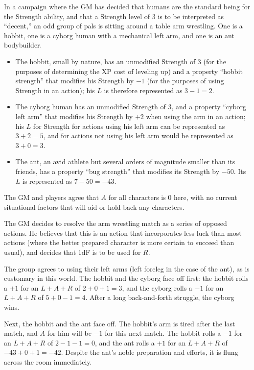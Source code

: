 \begin{example}
In a campaign where the GM has decided that humans are the standard being for the Strength ability,
and that a Strength level of 3 is to be interpreted as ``decent,'' an odd group of pals is sitting around a table arm wrestling.
One is a hobbit, one is a cyborg human with a mechanical left arm, and one is an ant bodybuilder.
\begin{itemize}
\item The hobbit, small by nature, has an unmodified Strength of $3$ (for the purposes of determining the XP cost of leveling up) and a property
``hobbit strength'' that modifies his Strength by $-1$ (for the purposes of using Strength in an action); his $L$ is therefore represented as $3-1=2$.
\item The cyborg human has an unmodified Strength of $3$, and a property ``cyborg left arm'' that modifies his Strength by $+2$ when using the arm in an action;
his $L$ for Strength for actions using his left arm can be represented as $3+2=5$, and for actions not using his left arm would be represented as $3+0=3$.
\item The ant, an avid athlete but several orders of magnitude smaller than its friends, has a property ``bug strength'' that modifies its Strength by $-50$.
Its $L$ is represented as $7-50=-43$.
\end{itemize}
The GM and players agree that $A$ for all characters is $0$ here, with no current situational factors that will aid or hold back any characters.

The GM decides to resolve the arm wrestling match as a series of opposed actions.
He believes that this is an action that incorporates less luck than most actions (where the better prepared character is more certain to succeed than usual),
and decides that $1$dF is to be used for $R$.

The group agrees to using their left arms (left foreleg in the case of the ant), as is customary in this world.
The hobbit and the cyborg face off first:
the hobbit rolls a $+1$ for an $L+A+R$ of $2+0+1=3$, and the cyborg rolls a $-1$ for an $L+A+R$ of $5+0-1=4$.
After a long back-and-forth struggle, the cyborg wins.

Next, the hobbit and the ant face off.
The hobbit’s arm is tired after the last match, and $A$ for him will be $-1$ for this next match.
The hobbit rolls a $-1$ for an $L+A+R$ of $2-1-1=0$, and the ant rolls a $+1$ for an $L+A+R$ of $-43+0+1=-42$.
Despite the ant’s noble preparation and efforts, it is flung across the room immediately.


\end{example}
